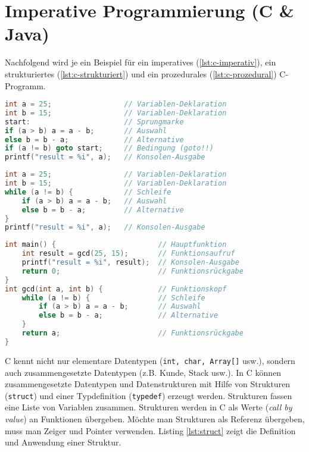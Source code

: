 \chapter{Imperative Programmierung (C \& Java)}

Nachfolgend wird je ein Beispiel für ein imperatives (\ref{lst:c-imperativ}), ein strukturiertes (\ref{lst:c-strukturiert}) und ein prozedurales (\ref{lst:c-prozedural}) C-Programm.

\begin{lstlisting}[language=C, caption=Imperatives C-Programm, label=lst:c-imperativ]
int a = 25; 				// Variablen-Deklaration
int b = 15; 				// Variablen-Deklaration
start: 						// Sprungmarke
if (a > b) a = a - b; 		// Auswahl
else b = b - a; 			// Alternative
if (a != b) goto start; 	// Bedingung (goto!!)
printf("result = %i", a); 	// Konsolen-Ausgabe
\end{lstlisting}

\begin{lstlisting}[language=C, caption=Strukturiertes C-Programm, label=lst:c-strukturiert]
int a = 25; 				// Variablen-Deklaration
int b = 15; 				// Variablen-Deklaration
while (a != b) { 			// Schleife
	if (a > b) a = a - b; 	// Auswahl
	else b = b - a; 		// Alternative
}
printf("result = %i", a); 	// Konsolen-Ausgabe
\end{lstlisting}

\begin{lstlisting}[language=C, caption=Prozedurales C-Programm, label=lst:c-prozedural]
int main() { 						// Hauptfunktion
	int result = gcd(25, 15); 		// Funktionsaufruf
	printf("result = %i", result); 	// Konsolen-Ausgabe
	return 0; 						// Funktionsrückgabe
}
int gcd(int a, int b) { 			// Funktionskopf
	while (a != b) { 				// Schleife
		if (a > b) a = a - b; 		// Auswahl
		else b = b - a; 			// Alternative
	}
	return a; 						// Funktionsrückgabe
}
\end{lstlisting}

C kennt nicht nur elementare Datentypen (\verb|int, char, Array[]| usw.), sondern auch zusammengesetzte Datentypen (z.B. Kunde, Stack usw.). In C können zusammengesetzte Datentypen und Datenstrukturen mit Hilfe von Strukturen (\verb|struct|) und einer Typdefinition (\verb|typedef|) erzeugt werden. Strukturen fassen eine Liste von Variablen zusammen. Strukturen werden in C als Werte (\textit{call by value}) an Funktionen übergeben. Möchte man Strukturen als Referenz übergeben, muss man Zeiger und Pointer verwenden. Listing \ref{lst:struct} zeigt die Definition und Anwendung einer Struktur.

